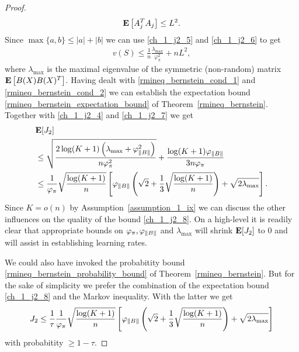 \begin{proof}
\begin{gather}
  \label{ch_1_j2_6}
  \mathbf{E}
  \left[ 
    A_j^T A_j
  \right]
  \le
  L^2.
\end{gather}
Since 
$
  \max\{a,b\}
  \le
  | a | + | b |
$
we can use 
\eqref{ch_1_j2_5}
and
\eqref{ch_1_j2_6}
to get
\begin{gather}
  \label{ch_1_j2_7}
  v(S)
  \le
  \frac{1}{n}
  \frac{\lambda_{\max}}{\varphi_{\pi}^2}
  +
  n L^2,
\end{gather}
where 
$\lambda_{\max}$ 
is the maximal eigenvalue of
the symmetric (non-random) matrix
$
  \mathbf{E}
  \left[ 
    B(X) B(X)^T
  \right]
$.
Having dealt with 
\eqref{rmineq_bernstein_cond_1} 
and
\eqref{rmineq_bernstein_cond_2}
we can establish 
the
expectation bound
\eqref{rmineq_bernstein_expectation_bound}
of Theorem~\ref{rmineq_bernstein}.
Together with 
\eqref{ch_1_j2_4}
and
\eqref{ch_1_j2_7}
we get
\begin{align}
  \label{ch_1_j2_8}
  \begin{split}
    &\mathbf{E}[J_2]
\\
  &\le
  \sqrt{
    \frac{
    2 \log (K + 1)
    \left( 
      \lambda_{\max}  + \varphi_{\left\lVert B\right\rVert}^2
    \right)
    }
    {
      n \varphi_{\pi}^2
    }
  }
  +
  \frac{
    \log (K + 1)
    \varphi_{\left\lVert B\right\rVert}
  }
  {
    3 n \varphi_{\pi}
  }
\\
  &\le
  \frac{1}{\varphi_{\pi}}
  \sqrt{
    \frac{
      \log(K + 1)
    }
    {
      n
    }
  }
  \left[
    \varphi_{\left\lVert B\right\rVert}
    \left(
      \sqrt{2}
      +
      \frac{1}{3}
      \sqrt{
        \frac{\log (K + 1)}{n}
      }
    \right)
    +
    \sqrt{
      2
      \lambda_{\max}
    }
  \right].
\end{split}
\end{align}
Since
$
  K = o(n)
$
by Assumption~\ref{assumption_1_ix}
we can discuss the other influences on the quality of the bound
\eqref{ch_1_j2_8}.
On a high-level it is readily clear
that appropriate bounds on
$
\varphi_{\pi},
\varphi_{\left\lVert B\right\rVert}
$
and
$
  \lambda_{\max}
$
will shrink
$
  \mathbf{E}[J_2]
$
to 0 
and will assist in establishing learning rates.

We could also have invoked the probabitity bound 
\eqref{rmineq_bernstein_probability_bound} 
of Theorem~\ref{rmineq_bernstein}.
But for the sake of simplicity we prefer the combination 
of the expectation bound 
\eqref{ch_1_j2_8}
and the Markov inequality.
With the latter we get
\begin{align}
  \label{ch_1_j2_result}
  J_2
  \le
  \frac{1}{\tau}
  \frac{1}{\varphi_{\pi}}
  \sqrt{
    \frac{
      \log(K + 1)
    }
    {
      n
    }
  }
  \left[
    \varphi_{\left\lVert B\right\rVert}
    \left(
      \sqrt{2}
      +
      \frac{1}{3}
      \sqrt{
        \frac{\log (K + 1)}{n}
      }
    \right)
    +
    \sqrt{
      2
      \lambda_{\max}
    }
  \right]
\end{align}
with probabitity 
$
  \ge
  1 - \tau
$.


\end{proof}
